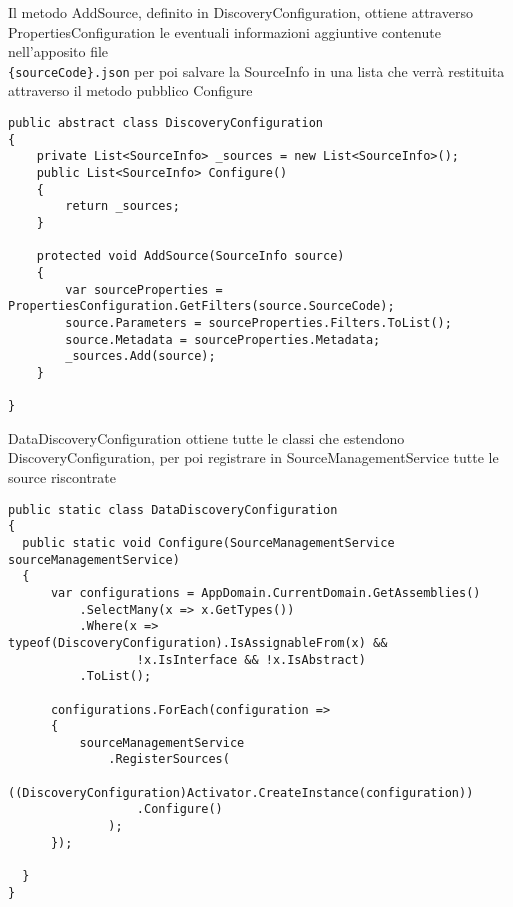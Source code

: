 Il metodo AddSource, definito in DiscoveryConfiguration, ottiene attraverso PropertiesConfiguration le eventuali informazioni aggiuntive contenute nell’apposito file\\ \verb|{sourceCode}.json| per poi salvare la SourceInfo in una lista che verrà restituita attraverso il metodo pubblico Configure
\begin{lstlisting}[caption={DiscoveryConfiguration.cs}, style=sharpCode]
public abstract class DiscoveryConfiguration
{
    private List<SourceInfo> _sources = new List<SourceInfo>();
    public List<SourceInfo> Configure()
    {
        return _sources;
    }

    protected void AddSource(SourceInfo source)
    {
        var sourceProperties = PropertiesConfiguration.GetFilters(source.SourceCode);
        source.Parameters = sourceProperties.Filters.ToList();
        source.Metadata = sourceProperties.Metadata;
        _sources.Add(source);
    }

}
\end{lstlisting}
DataDiscoveryConfiguration ottiene tutte le classi che estendono DiscoveryConfiguration, per poi registrare in SourceManagementService tutte le source riscontrate
\begin{lstlisting}[caption={DataDiscoveryConfiguraton.cs}, style=sharpCode]
public static class DataDiscoveryConfiguration
{
  public static void Configure(SourceManagementService sourceManagementService)
  {
      var configurations = AppDomain.CurrentDomain.GetAssemblies()
          .SelectMany(x => x.GetTypes())
          .Where(x => typeof(DiscoveryConfiguration).IsAssignableFrom(x) && 
                  !x.IsInterface && !x.IsAbstract)
          .ToList();

      configurations.ForEach(configuration =>
      {
          sourceManagementService
              .RegisterSources(
                  ((DiscoveryConfiguration)Activator.CreateInstance(configuration))
                  .Configure()
              );
      });

  }
}
\end{lstlisting}
